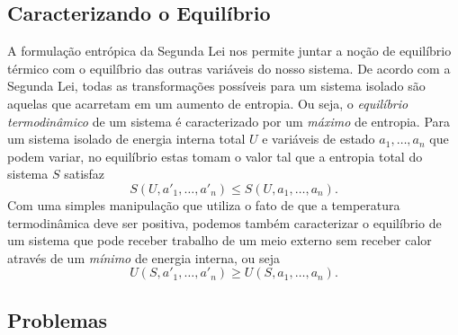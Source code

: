 \documentclass[a4paper, 12pt]{article}
\theoremstyle{definition}
\theoremstyle{definition}
\begin{document}
\subsection{Caracterizando o Equilíbrio}

A formulação entrópica da Segunda Lei nos permite juntar a noção de equilíbrio térmico com o equilíbrio
das outras variáveis do nosso sistema. De acordo com a Segunda Lei, todas as transformações possíveis para
um sistema isolado são aquelas que acarretam em um aumento de entropia. Ou seja, o \textit{equilíbrio
termodinâmico} de um sistema é caracterizado por um \textit{máximo} de entropia. Para um sistema isolado
de energia interna total $U$ e variáveis de estado $a_1,\dots,a_n$ que podem variar, no equilíbrio estas
tomam o valor tal que a entropia total do sistema $S$ satisfaz
$$S(U,a'_1,\dots,a'_n)\leq S(U,a_1,\dots,a_n).$$
Com uma simples manipulação que utiliza o fato de que a temperatura termodinâmica deve ser positiva, podemos 
também caracterizar o equilíbrio de um sistema que pode receber trabalho de um meio externo sem receber calor 
através de um \textit{mínimo} de energia interna, ou seja
$$U(S,a'_1,\dots,a'_n)\geq U(S,a_1,\dots,a_n).$$

\subsection{Problemas}
\end{document}
